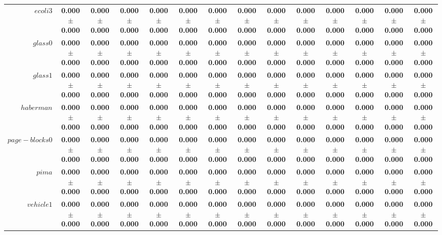 \begin{table}[!ht]
{\begin{tabular}{r c c c c c c c c c c c c c}
$ecoli3$ & \textbf{0.000 $\pm$ 0.000} & \textbf{0.000 $\pm$ 0.000} & \textbf{0.000 $\pm$ 0.000} & \textbf{0.000 $\pm$ 0.000} & \textbf{0.000 $\pm$ 0.000} & \textbf{0.000 $\pm$ 0.000} & \textbf{0.000 $\pm$ 0.000} & \textbf{0.000 $\pm$ 0.000} & \textbf{0.000 $\pm$ 0.000} & \textbf{0.000 $\pm$ 0.000} & \textbf{0.000 $\pm$ 0.000} & \textbf{0.000 $\pm$ 0.000} & \textbf{0.000 $\pm$ 0.000} \\
$glass0$ & \textbf{0.000 $\pm$ 0.000} & \textbf{0.000 $\pm$ 0.000} & \textbf{0.000 $\pm$ 0.000} & \textbf{0.000 $\pm$ 0.000} & \textbf{0.000 $\pm$ 0.000} & \textbf{0.000 $\pm$ 0.000} & \textbf{0.000 $\pm$ 0.000} & \textbf{0.000 $\pm$ 0.000} & \textbf{0.000 $\pm$ 0.000} & \textbf{0.000 $\pm$ 0.000} & \textbf{0.000 $\pm$ 0.000} & \textbf{0.000 $\pm$ 0.000} & \textbf{0.000 $\pm$ 0.000} \\
$glass1$ & \textbf{0.000 $\pm$ 0.000} & \textbf{0.000 $\pm$ 0.000} & \textbf{0.000 $\pm$ 0.000} & \textbf{0.000 $\pm$ 0.000} & \textbf{0.000 $\pm$ 0.000} & \textbf{0.000 $\pm$ 0.000} & \textbf{0.000 $\pm$ 0.000} & \textbf{0.000 $\pm$ 0.000} & \textbf{0.000 $\pm$ 0.000} & \textbf{0.000 $\pm$ 0.000} & \textbf{0.000 $\pm$ 0.000} & \textbf{0.000 $\pm$ 0.000} & \textbf{0.000 $\pm$ 0.000} \\
$haberman$ & \textbf{0.000 $\pm$ 0.000} & \textbf{0.000 $\pm$ 0.000} & \textbf{0.000 $\pm$ 0.000} & \textbf{0.000 $\pm$ 0.000} & \textbf{0.000 $\pm$ 0.000} & \textbf{0.000 $\pm$ 0.000} & \textbf{0.000 $\pm$ 0.000} & \textbf{0.000 $\pm$ 0.000} & \textbf{0.000 $\pm$ 0.000} & \textbf{0.000 $\pm$ 0.000} & \textbf{0.000 $\pm$ 0.000} & \textbf{0.000 $\pm$ 0.000} & \textbf{0.000 $\pm$ 0.000} \\
$page-blocks0$ & \textbf{0.000 $\pm$ 0.000} & \textbf{0.000 $\pm$ 0.000} & \textbf{0.000 $\pm$ 0.000} & \textbf{0.000 $\pm$ 0.000} & \textbf{0.000 $\pm$ 0.000} & \textbf{0.000 $\pm$ 0.000} & \textbf{0.000 $\pm$ 0.000} & \textbf{0.000 $\pm$ 0.000} & \textbf{0.000 $\pm$ 0.000} & \textbf{0.000 $\pm$ 0.000} & \textbf{0.000 $\pm$ 0.000} & \textbf{0.000 $\pm$ 0.000} & \textbf{0.000 $\pm$ 0.000} \\
$pima$ & \textbf{0.000 $\pm$ 0.000} & \textbf{0.000 $\pm$ 0.000} & \textbf{0.000 $\pm$ 0.000} & \textbf{0.000 $\pm$ 0.000} & \textbf{0.000 $\pm$ 0.000} & \textbf{0.000 $\pm$ 0.000} & \textbf{0.000 $\pm$ 0.000} & \textbf{0.000 $\pm$ 0.000} & \textbf{0.000 $\pm$ 0.000} & \textbf{0.000 $\pm$ 0.000} & \textbf{0.000 $\pm$ 0.000} & \textbf{0.000 $\pm$ 0.000} & \textbf{0.000 $\pm$ 0.000} \\
$vehicle1$ & \textbf{0.000 $\pm$ 0.000} & \textbf{0.000 $\pm$ 0.000} & \textbf{0.000 $\pm$ 0.000} & \textbf{0.000 $\pm$ 0.000} & \textbf{0.000 $\pm$ 0.000} & \textbf{0.000 $\pm$ 0.000} & \textbf{0.000 $\pm$ 0.000} & \textbf{0.000 $\pm$ 0.000} & \textbf{0.000 $\pm$ 0.000} & \textbf{0.000 $\pm$ 0.000} & \textbf{0.000 $\pm$ 0.000} & \textbf{0.000 $\pm$ 0.000} & \textbf{0.000 $\pm$ 0.000} \\

\end{tabular}}
\end{table}
